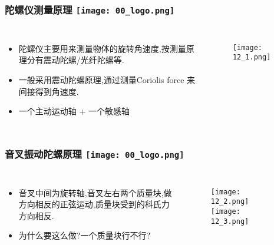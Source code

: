 \begin{frame}
  \frametitle{陀螺仪测量原理 \hfill \texttt{[image: 00\_logo.png]}}
  \begin{columns}
    
    \begin{itemize}
      \item 陀螺仪主要用来测量物体的旋转角速度,按测量原理分有震动陀螺/光纤陀螺等.

      \item 一般采用震动陀螺原理,通过测量Coriolis force 来间接得到角速度.
      
      \item 一个主动运动轴 + 一个敏感轴

    \end{itemize}
    
    \begin{figure}[h]
      \texttt{[image: 12\_1.png]}
    \end{figure}

  
  \end{columns}
  \end{frame}    


\begin{frame}
  \frametitle{音叉振动陀螺原理 \hfill \texttt{[image: 00\_logo.png]}}
  \begin{columns}
    
    \begin{itemize}
      \item 音叉中间为旋转轴,音叉左右两个质量块,做方向相反的正弦运动,质量块受到的科氏力方向相反.
      \item 为什么要这么做?一个质量块行不行?

    \end{itemize}
    
    \begin{figure}[h]
      \texttt{[image: 12\_2.png]}
      \qquad
      \texttt{[image: 12\_3.png]}
    \end{figure}

  
  \end{columns}
  \end{frame}    

